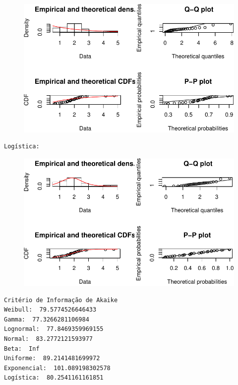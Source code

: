 \documentclass[
  letterpaper,
  DIV=11,
  numbers=noendperiod]{scrartcl}
\begin{document}
\begin{figure}[H]

{\centering \includegraphics{quiz5_files/figure-pdf/unnamed-chunk-33-8.pdf}

}

\end{figure}

\begin{verbatim}
Logística: 
\end{verbatim}

\begin{figure}[H]

{\centering \includegraphics{quiz5_files/figure-pdf/unnamed-chunk-33-9.pdf}

}

\end{figure}

\begin{verbatim}
Critério de Informação de Akaike
Weibull:  79.5774526646433 
Gamma:  77.3266281106984 
Lognormal:  77.8469359969155 
Normal:  83.2772121593977 
Beta:  Inf 
Uniforme:  89.2141481699972 
Exponencial:  101.089198302578 
Logística:  80.2541161161851 
\end{verbatim}
\end{document}
